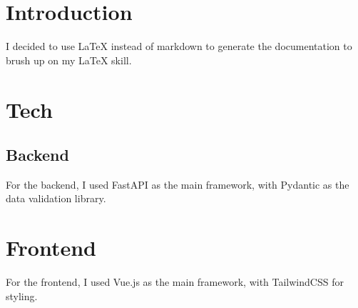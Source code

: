 \documentclass{article}
\begin{document}
\section{Introduction}
I decided to use LaTeX instead of markdown to generate the documentation to brush up on my LaTeX skill.

\section{Tech}
\subsection{Backend}
For the backend, I used FastAPI as the main framework, with Pydantic as the data validation library.

\section{Frontend}
For the frontend, I used Vue.js as the main framework, with TailwindCSS for styling.
\end{document}
